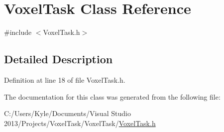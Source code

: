 \hypertarget{class_voxel_task}{}\section{Voxel\+Task Class Reference}
\label{class_voxel_task}


{\ttfamily \#include $<$Voxel\+Task.\+h$>$}



\subsection{Detailed Description}


Definition at line 18 of file Voxel\+Task.\+h.



The documentation for this class was generated from the following file\+:\begin{DoxyCompactItemize}
\item 
C\+:/\+Users/\+Kyle/\+Documents/\+Visual Studio 2013/\+Projects/\+Voxel\+Task/\+Voxel\+Task/\hyperlink{_voxel_task_8h}{Voxel\+Task.\+h}\end{DoxyCompactItemize}

